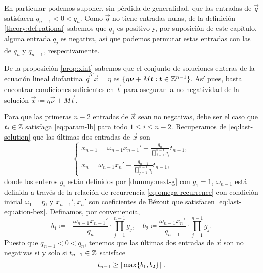En particular podemos suponer, sin pérdida de generalidad, que las entradas de  $\vec{q}$ satisfacen
$q_{n-1} < 0 < q_n$. Como $\vec{q}$ no tiene entradas nulas, de la
definición \ref{theory:def:rational} sabemos que $q_1$ es positivo y, por suposición de este capítulo,
alguna entrada $q_j$ es negativa, así que podemos permutar estas entradas con las de $q_n$ y
$q_{n-1}$, respectivamente.

De la proposición \ref{prop:xint} sabemos que el conjunto de soluciones enteras de la ecuación
lineal diofantina $\vec{q}^T\vec{x} = \eta$ es $\lbrace \eta\boldsymbol{\nu} + M\boldsymbol{t} \vcentcolon \boldsymbol{t}
\in \mathbb{Z}^{n-1} \rbrace$. Así pues, basta encontrar condiciones suficientes en $\vec{t}$ para asegurar la no
negatividad de la solución $\vec{x} \coloneq \eta\vec{\nu} + M\vec{t}$.

Para que las primeras $n - 2$ entradas de $\vec{x}$ sean no negativas, debe ser el caso que $t_i \in
\mathbb{Z}$ satisfaga \eqref{eq:param-lb} para todo $1 \leq i \leq n - 2$. Recuperamos de
\eqref{eq:last-solution} que las últimas dos entradas de $\vec{x}$ son
\begin{equation*}
	\begin{cases}
		x_{n-1} = \omega_{n-1}x_{n-1}' + \frac{q_n}{\prod_{j=1}^{n-1}g_j}t_{n-1}, \\
		x_n = \omega_{n-1}x_n' - \frac{q_{n-1}}{\prod_{j=1}^{n-1}g_j}t_{n-1},
	\end{cases}
\end{equation*}
donde los enteros $g_i$ están definidos por \eqref{dummy:next-g} con $g_1 = 1$, $\omega_{n-1}$ está
definida a través de la relación de recurrencia \eqref{eq:omega-recurrence} con condición inicial
$\omega_1 = \eta$, y $x_{n-1}', x_n'$ son coeficientes de Bézout que satisfacen
\eqref{eq:last-equation-bez}. Definamos, por conveniencia,
\begin{equation}
	\label{eq:lr-bounds}
	b_1 \coloneq -\frac{\omega_{n-1}x_{n-1}'}{q_n} \cdot \prod_{j=1}^{n-1}g_j, \quad
	b_2 \coloneq \frac{\omega_{n-1}x_{n}'}{q_{n-1}} \cdot \prod_{j=1}^{n-1}g_j.
\end{equation}
Puesto que $q_{n-1} < 0 < q_n$, tenemos que las últimas dos entradas de $\vec{x}$ son no negativas
si y solo si $t_{n-1} \in \mathbb{Z}$ satisface
\begin{equation}
	\label{eq:feasible-param:collapsed}
	t_{n-1} \geq \left\lceil \max\lbrace b_1, b_2 \rbrace \right\rceil.
\end{equation}

